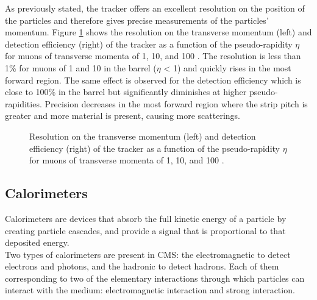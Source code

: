 				As previously stated, the tracker offers an excellent resolution on the position of the particles and therefore gives precise measurements of the particles' momentum. Figure \ref{fig:lhc_and_cms__cms_tracker_performances} shows the resolution on the transverse momentum \pT{} (left) and detection efficiency (right) of the tracker as a function of the pseudo-rapidity $ \eta $ for muons of transverse momenta \pT{} of 1, 10, and 100 \GeVc{}. The resolution is less than 1\% for muons of 1 and 10 \GeVc{} in the barrel ($ \eta $ < 1) and quickly rises in the most forward region. The same effect is observed for the detection efficiency which is close to 100\% in the barrel but significantly diminishes at higher pseudo-rapidities. Precision decreases in the most forward region where the strip pitch is greater and more material is present, causing more scatterings.

				\begin{figure}[h!]
					\centering
					\caption{Resolution on the transverse momentum \pT{} (left) and detection efficiency (right) of the tracker as a function of the pseudo-rapidity $ \eta $ for muons of transverse momenta \pT{} of 1, 10, and 100 \GeVc{} \Cite{CMS_at_LHC}.}
					\label{fig:lhc_and_cms__cms_tracker_performances}
				\end{figure}

		\subsection{Calorimeters}
		\label{sec:lhc_and_cms__calorimeters}

			Calorimeters are devices that absorb the full kinetic energy of a particle by creating particle cascades, and provide a signal that is proportional to that deposited energy. \\

			Two types of calorimeters are present in CMS: the electromagnetic to detect electrons and photons, and the hadronic to detect hadrons. Each of them corresponding to two of the elementary interactions through which particles can interact with the medium: electromagnetic interaction and strong interaction. \\


